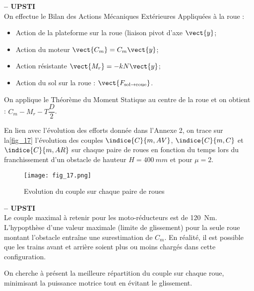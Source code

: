 \ifprof
\begin{corrige}\textbf{ -- UPSTI}\\ 
On effectue le Bilan des Actions Mécaniques Extérieures Appliquées à la roue :
\begin{itemize}
\item Action de la plateforme sur la roue (liaison pivot d’axe $\vect{y}$;
\item Action du moteur $\vect{C_m}=C_m\vect{y}$;
\item Action résistante $\vect{M_r}=-kN\vect{y}$;
\item Action du sol sur la roue : $\vect{F_{\text{sol} \rightarrow \text{roue}}}$.
\end{itemize}

On applique le Théorème du Moment Statique au centre de la roue et on obtient :
$C_m - M_r - T\dfrac{D}{2}$.

\end{corrige}
\else
\fi

En lien avec l'évolution des efforts donnée dans l'Annexe 2, on trace sur la\autoref{fig_17} l'évolution
des couples $\indice{C}{m, AV}$, $\indice{C}{m,C}$ et $\indice{C}{m,AR}$ sur chaque paire de roues en fonction du temps lors du franchissement d'un obstacle de hauteur $H =\SI{400}{mm}$ et pour $\mu=2$.

\begin{figure}[H]
\centering
\texttt{[image: fig\_17.png]}
\caption{Evolution du couple sur chaque paire de roues\label{fig_17}}
\end{figure}


\ifprof
\begin{corrige}\textbf{ -- UPSTI}\\ 
Le couple maximal à retenir pour les moto-réducteurs est de \SI{120}{Nm}.
L’hypopthèse d’une valeur maximale (limite de glissement) pour la seule roue montant l’obstacle entraîne une surestimation de $C_m$. En réalité, il est possible que les trains avant et arrière soient plus ou moins chargés dans cette configuration.
\end{corrige}
\else
\fi

On cherche à présent la meilleure répartition du couple sur chaque roue, minimisant la puissance
motrice tout en évitant le glissement.

